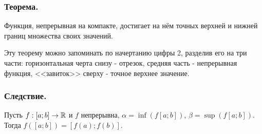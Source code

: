 \subsubsection{Теорема.}

Функция, непрерывная на компакте, достигает на нём точных верхней и нижней границ множества своих значений.

\mnemo
Эту теорему можно запоминать по начертанию цифры {\LARGE 2}, разделив его на три части: горизонтальная черта снизу - отрезок, средняя часть - непрерывная функция, <<завиток>> сверху - точное верхнее значение.


\subsubsection{Следствие.}

Пусть $f:[a;b]\to\mathbb{R}$ и $f$ непрерывна, $\alpha=\inf(f[a;b])$, $\beta=\sup(f[a;b])$.
Тогда $f([a;b])=[f(a);f(b)]$.



